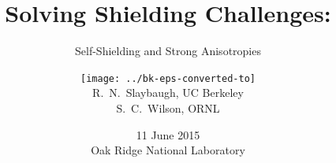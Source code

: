 \documentclass[xcolor=x11names,compress]{beamer}
\renewcommand{\(}{\begin{columns}}
\renewcommand{\)}{\end{columns}}
\newcommand{\<}[1]{\begin{column}{#1}}
\renewcommand{\>}{\end{column}}
\begin{document}
\begin{frame}
\title{Solving Shielding Challenges:}
\subtitle{Self-Shielding and Strong Anisotropies}
\author{\texttt{[image: ../bk-eps-converted-to]}\\R.\ N.\ Slaybaugh, UC Berkeley \\ S.\ C.\ Wilson, ORNL}
\date{11 June 2015 \\ Oak Ridge National Laboratory}
\titlepage
\end{frame}


\end{document}
